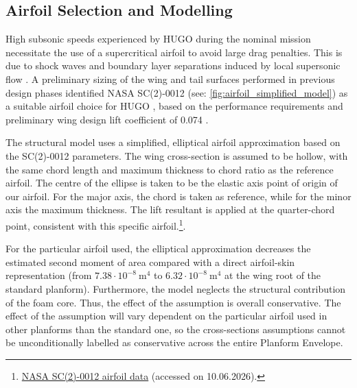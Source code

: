 \subsection{Airfoil Selection and Modelling}
\label{sub:airfoil_selection}
High subsonic speeds experienced by HUGO during the nominal mission necessitate the use of a supercritical airfoil to avoid large drag penalties. This is due to shock waves and boundary layer separations induced by local supersonic flow \cite{Whitcomb1974}. A preliminary sizing of the wing and tail surfaces performed in previous design phases identified NASA SC(2)-0012 (see: \autoref{fig:airfoil_simplified_model}) as a suitable airfoil choice for HUGO \cite{Harris1990}, based on the performance requirements and preliminary wing design lift coefficient of 0.074 .

The structural model uses a simplified, elliptical airfoil approximation based on the SC(2)-0012 parameters. The wing cross-section is assumed to be hollow, with the same chord length and maximum thickness to chord ratio as the reference airfoil. The centre of the ellipse is taken to be the elastic axis point of origin of our airfoil. For the major axis, the chord is taken as reference, while for the minor axis the maximum thickness. The lift resultant is applied at the quarter-chord point, consistent with this specific airfoil.\footnote{\href{http://airfoiltools.com/airfoil/details?airfoil=sc20012-il}{NASA SC(2)-0012 airfoil data} (accessed on 10.06.2026).}. 

For the particular airfoil used, the elliptical approximation decreases the estimated second moment of area compared with a direct airfoil-skin representation (from $7.38\cdot10^{-8}\ \mathrm{m}^4$ to $6.32\cdot10^{-8}\ \mathrm{m}^4$ at the wing root of the standard planform). Furthermore, the model neglects the structural contribution of the foam core. Thus, the effect of the assumption is overall conservative. The effect of the assumption will vary dependent on the particular airfoil used in other planforms than the standard one, so the cross-sections assumptions cannot be unconditionally labelled as conservative across the entire Planform Envelope. %

